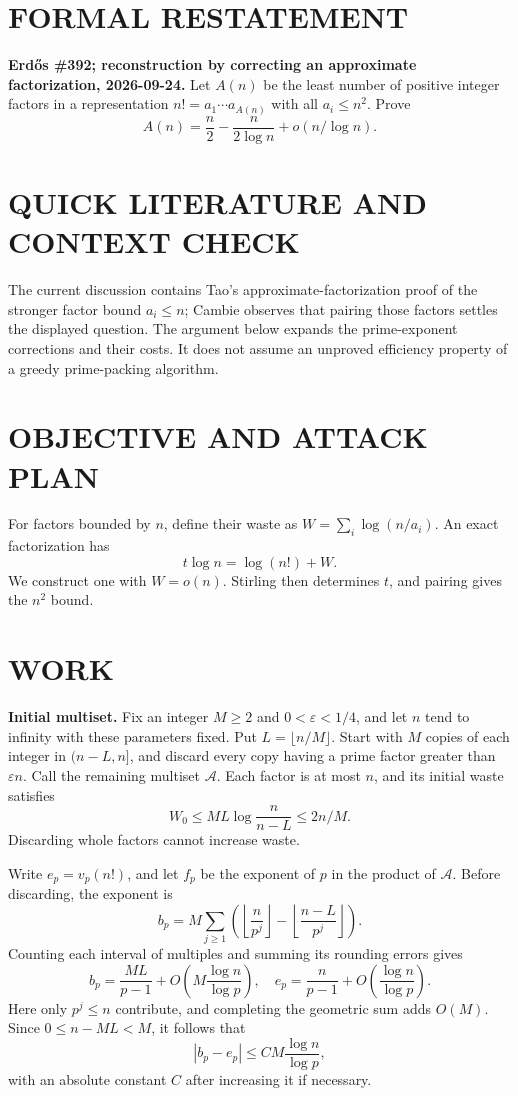 \section{FORMAL RESTATEMENT}
\textbf{Erd\H{o}s \#392; reconstruction by correcting an approximate factorization, 2026-09-24.}
Let $A(n)$ be the least number of positive integer factors in a representation $n!=a_1\cdots a_{A(n)}$ with all $a_i\leq n^2$. Prove
\[
A(n)=\frac n2-\frac{n}{2\log n}+o(n/\log n).
\]

\section{QUICK LITERATURE AND CONTEXT CHECK}
The current discussion contains Tao's approximate-factorization proof of the stronger factor bound $a_i\leq n$; Cambie observes that pairing those factors settles the displayed question. The argument below expands the prime-exponent corrections and their costs. It does not assume an unproved efficiency property of a greedy prime-packing algorithm.

\section{OBJECTIVE AND ATTACK PLAN}
For factors bounded by $n$, define their waste as $W=\sum_i\log(n/a_i)$. An exact factorization has
\[
t\log n=\log(n!)+W.                                      \tag{1}
\]
We construct one with $W=o(n)$. Stirling then determines $t$, and pairing gives the $n^2$ bound.

\section{WORK}
\textbf{Initial multiset.} Fix an integer $M\geq2$ and $0<\varepsilon<1/4$, and let $n$ tend to infinity with these parameters fixed. Put $L=\lfloor n/M\rfloor$. Start with $M$ copies of each integer in $(n-L,n]$, and discard every copy having a prime factor greater than $\varepsilon n$. Call the remaining multiset $\mathcal A$. Each factor is at most $n$, and its initial waste satisfies
\[
W_0\leq ML\log\frac n{n-L}\leq 2n/M.                    \tag{2}
\]
Discarding whole factors cannot increase waste.

Write $e_p=v_p(n!)$, and let $f_p$ be the exponent of $p$ in the product of $\mathcal A$. Before discarding, the exponent is
\[
b_p=M\sum_{j\geq1}\left(\left\lfloor\frac n{p^j}\right\rfloor-
\left\lfloor\frac{n-L}{p^j}\right\rfloor\right).
\]
Counting each interval of multiples and summing its rounding errors gives
\[
b_p=\frac{ML}{p-1}+O\!\left(M\frac{\log n}{\log p}\right),\quad
e_p=\frac n{p-1}+O\!\left(\frac{\log n}{\log p}\right).
\]
Here only $p^j\leq n$ contribute, and completing the geometric sum adds $O(M)$. Since $0\leq n-ML<M$, it follows that
\[
|b_p-e_p|\leq C M\frac{\log n}{\log p},                   \tag{3}
\]
with an absolute constant $C$ after increasing it if necessary.

